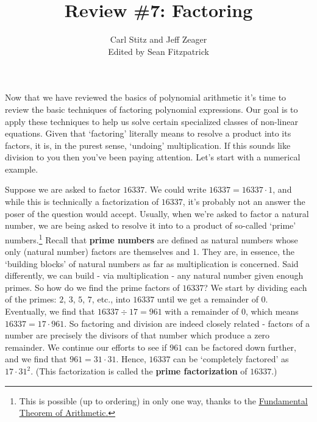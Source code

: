 \documentclass[11pt]{article}
\title{Review \#7: Factoring}
\author{Carl Stitz and Jeff Zeager\\
Edited by Sean Fitzpatrick}
\theoremstyle{definition}  %
\begin{document}
\maketitle


\renewcommand{\headrulewidth}{0pt}
\renewcommand{\headheight}{14pt}
\lhead[\fancyplain{}{\sc\thepage}]%
      {\fancyplain{}{\sc \nouppercase{\rightmark}}}
\rhead[\fancyplain{}{\sc \nouppercase{\leftmark}}]%
      {\fancyplain{}{\sc\thepage}}
\cfoot{}


Now that we have reviewed the basics of polynomial arithmetic it's time to review the basic techniques of factoring polynomial expressions.  Our goal is to apply these techniques to help us solve certain specialized classes of non-linear equations.  Given that `factoring' literally means to resolve a product into its factors, it is, in the purest sense, `undoing' multiplication.  If this sounds like division to you then you've been paying attention.  Let's start with a numerical example.  

\smallskip

Suppose we are asked to factor $16337$.  We could write $16337 = 16337 \cdot 1$, and while this is technically a factorization of $16337$,  it's probably not an answer the poser of the question would accept.  Usually, when we're asked to factor a natural number, we are being asked to resolve it into to a product of so-called 	`prime' numbers.\footnote{This is possible (up to ordering) in only one way, thanks to the \href{https://en.wikipedia.org/wiki/Fundamental_theorem_of_arithmetic}{\underline{Fundamental Theorem of Arithmetic}.}}  Recall that \textbf{prime numbers} are defined as natural numbers whose only (natural number) factors are themselves and $1$. They are, in essence, the `building blocks' of natural numbers as far as multiplication is concerned.  Said differently, we can build - via multiplication - any natural number given enough primes.  So how do we find the prime factors of $16337$?  We start by dividing each of the primes: $2$, $3$, $5$, $7$, etc., into $16337$ until we get a remainder of $0$.  Eventually, we find that $16337 \div 17 = 961$ with a remainder of $0$, which means $16337 = 17 \cdot 961$.  So factoring and division are indeed closely related - factors of a number are precisely the divisors of that number which produce a zero remainder.  We continue our efforts to see if $961$ can be factored down further, and we find that $961 = 31 \cdot 31$.  Hence, $16337$ can be `completely factored' as $17 \cdot 31^2$.  (This factorization is called the \textbf{prime factorization} of $16337$.)  
\end{document}
